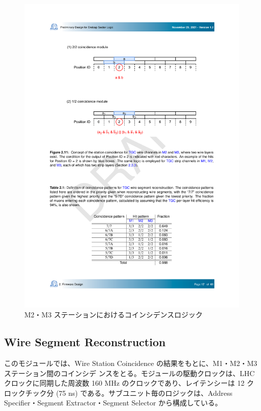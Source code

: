 \begin{figure} 
\centering
\includegraphics[width=16cm]{fig/SL/StationCoin_doublet.pdf}
\caption[M2・M3 ステーションにおけるコインシデンスロジック]{M2・M3 ステーションにおけるコインシデンスロジック}
\label{StationCoin_doublet}
\end{figure}

\subsection*{Wire Segment Reconstruction}
このモジュールでは、Wire Station Coincidence の結果をもとに、M1・M2・M3 ステーション間のコインシデ ンスをとる。モジュールの駆動クロックは、LHC クロックに同期した周波数 160 MHz のクロックであり、レイテンシーは 12 クロックチック分 (75 ns) である。サブユニット毎のロジックは、Address Specifier・Segment Extractor・Segment Selector から構成している。

